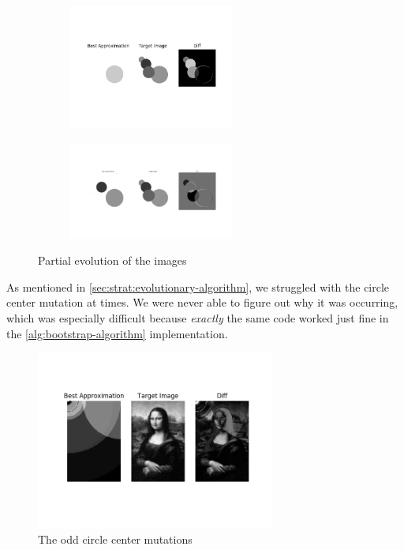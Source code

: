 \documentclass{article}
\begin{document}
\begin{figure}[H]
    \centering
    \begin{subfigure}[b]{\textwidth}
        \centering
        \includegraphics[width=0.6\textwidth]{output/evolve_one.png}
    \end{subfigure}
    \begin{subfigure}[b]{\textwidth}
        \centering
        \includegraphics[width=0.6\textwidth]{output/evolve_some.png}
    \end{subfigure}
    \caption{Partial evolution of the images}\label{fig:partial}
\end{figure}

As mentioned in \autoref{sec:strat:evolutionary-algorithm}, we struggled with the circle center
mutation at times. We were never able to figure out why it was occurring, which was especially
difficult because \textit{exactly} the same code worked just fine in the
\autoref{alg:bootstrap-algorithm} implementation.

\begin{figure}[H]
    \centering
    \includegraphics[width=0.7\textwidth]{output/ea-p100c200g400.png}
    \caption{The odd circle center mutations}\label{fig:center-mutations}
\end{figure}
\end{document}
